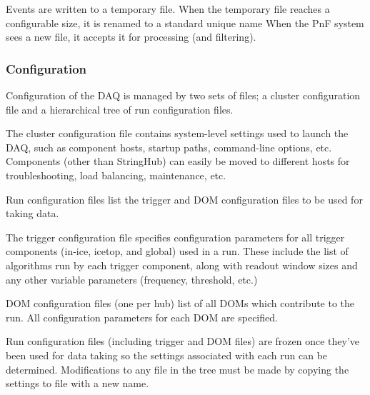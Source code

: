 Events are written to a temporary file.  When the temporary
file reaches a configurable size, it is renamed to a standard unique name
When the PnF system sees a new file, it accepts it for
processing (and filtering).


\subsubsection{Configuration}

Configuration of the DAQ is managed by two sets of files; a cluster
configuration file and a hierarchical tree of run configuration files.

The cluster configuration file contains system-level settings used to launch
the DAQ, such as component hosts, startup paths, command-line options, etc.
Components
(other than StringHub) can easily be moved to different hosts for
troubleshooting, load balancing, maintenance, etc.

Run configuration files list the trigger and DOM configuration files to be
used for taking data.

The trigger configuration file specifies configuration parameters for all
trigger components (in-ice, icetop, and global) used in a run.  These include
the list of algorithms run by each trigger component, along with readout window
sizes and any other variable parameters (frequency, threshold, etc.)

DOM configuration files (one per hub) list of all DOMs which contribute to the
run.  All configuration parameters for each DOM are specified.

Run configuration files (including trigger and DOM files) are frozen once
they've been used for data taking so the settings associated with each run can
be determined.  Modifications to any file in the tree must be made by copying
the settings to file with a new name.

